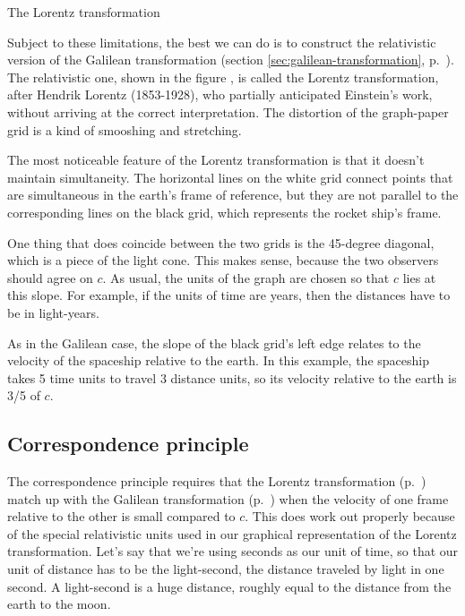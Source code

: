 \begin{section}{The Lorentz transformation}

Subject to these limitations, the best we can do is to construct the relativistic
version of the Galilean transformation (section \ref{sec:galilean-transformation},
p.~\pageref{sec:galilean-transformation}). The relativistic one, shown in the figure
, is called
the Lorentz transformation, after Hendrik Lorentz (1853-1928),
who partially anticipated Einstein's work, without arriving at the correct interpretation.
The distortion of the graph-paper grid is a kind of smooshing and stretching.




The most noticeable feature of the Lorentz transformation is that it doesn't
maintain simultaneity. The horizontal lines on the white grid connect points
that are simultaneous in the earth's frame of reference, but they are not
parallel to the corresponding lines on the black grid, which represents the
rocket ship's frame.

One thing that does coincide between the two grids is the 45-degree diagonal,
which is a piece of the light cone. This makes sense, because the two observers
should agree on $c$. As usual, the units of the graph are chosen so that $c$ lies
at this slope. For example, if the units of time are years, then the distances have
to be in light-years.

As in the Galilean case, the slope of the black grid's left edge relates to the velocity of
the spaceship relative to the earth. In this example, the spaceship takes 5 time units to
travel 3 distance units, so its velocity relative to the earth is 3/5 of $c$.

\section{Correspondence principle}

The correspondence principle requires that the Lorentz transformation (p.~\pageref{fig:lorentz-transformation})
match up with the Galilean transformation (p.~\pageref{sec:galilean-transformation}) when the
velocity of one frame relative to the other is small compared to $c$.
This does work out properly because of the special relativistic units used in our graphical representation of the
Lorentz transformation. Let's say that we're using seconds as our unit of time, so that our unit of
distance has to be the light-second, the distance traveled by light in one second. A light-second
is a huge distance, roughly equal to the distance from the earth to the moon.


\end{section}
